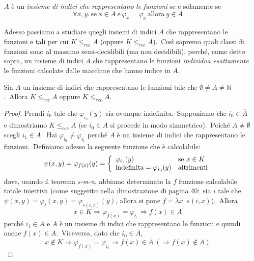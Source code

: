 \begin{definition}
    $A$ è un \textit{insieme di indici che rappresentano le funzioni} se e solamente se
    \[\forall x,y.\ \mathrm{se}\ x \in A\ \mathrm{e}\ \varphi_x = \varphi_y\ \mathrm{allora}\ y \in A\]
\end{definition}

\noindent Adesso passiamo a studiare quegli insiemi di indici $A$ che rappresentano le funzioni e tali per cui $K \leqslant_{rec} A$ (oppure $K \leqslant_{rec} \bar{A}$).\
Così sapremo quali classi di funzioni sono al massimo semi-decidibili (ma non decidibili), perché, come detto sopra, un insieme di indici $A$ che rappresentano le funzioni \textit{individua esattamente} le funzioni calcolate dalle macchine che hanno indice in $A$.

\begin{theorem}
    \label{i.i.r.f}
    Sia $A$ un insieme di indici che rappresentano le funzioni tale che $\emptyset \neq A \neq \mathbb{N}$.\
    Allora $K \leqslant_{rec} A$ oppure $K \leqslant_{rec} \bar{A}$.
\end{theorem}

\begin{proof}
    Prendi $i_0$ tale che $\varphi_{i_0}(y)$ sia ovunque indefinita.\
    Supponiamo che $i_0 \in \bar{A}$ e dimostriamo $K \leqslant_{rec} A$ (se $i_0 \in A$ si procede in modo simmetrico).\
    Poiché $A \neq \emptyset$ scegli $i_1 \in A$.\
    Hai $\varphi_{i_0} \neq \varphi_{i_1}$ perché $A$ è un insieme di indici che rappresentano le funzioni.\
    Definiamo adesso la seguente funzione che è calcolabile:
    \[\psi(x,y) = \varphi_{f(x)}(y) = \left\{\begin{array}{l l}
            \varphi_{i_1}(y)                       & \mathrm{se}\ x \in K \\
            \mathrm{indefinita} = \varphi_{i_0}(y) & \mathrm{altrimenti}  \\
        \end{array}\right.\]
    dove, usando il teorema \textit{s-m-n}, abbiamo determinato la $f$ funzione calcolabile totale iniettiva (come suggerito nella dimostrazione di pagina 40:\ sia $i$ tale che $\psi(x,y) = \varphi_i(x,y) = \varphi_{s(i,x)}(y)$, allora si pone $f = \lambda x.\ s(i,x)$).\
    Allora
    \[x \in K \Rightarrow \varphi_{f(x)} = \varphi_{i_1} \Rightarrow f(x) \in A\]
    perché $i_1 \in A$ e $A$ è un insieme di indici che rappresentano le funzioni e quindi anche $f(x) \in A$.\
    Viceversa, dato che $i_0 \in \bar{A}$,
    \[x \notin K \Rightarrow \varphi_{f(x)} = \varphi_{i_0} \Rightarrow f(x) \in \bar{A}\ (\Rightarrow f(x) \notin A)\]
\end{proof}

